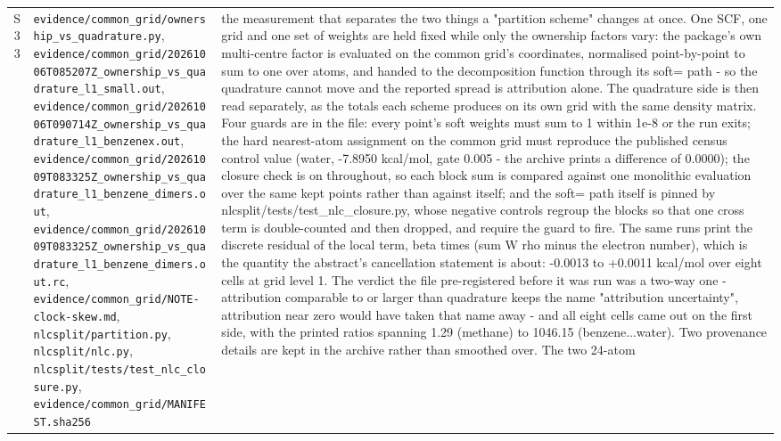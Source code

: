 \documentclass[11pt]{article}
\begin{document}
\begin{longtable}{c>{\raggedright\arraybackslash}p{}>{\raggedright\arraybackslash}p{}}
S33 & \texttt{evidence/\allowbreak{}common\_\allowbreak{}grid/\allowbreak{}ownership\_\allowbreak{}vs\_\allowbreak{}quadrature.py}, \texttt{evidence/\allowbreak{}common\_\allowbreak{}grid/\allowbreak{}20261006T085207Z\_\allowbreak{}ownership\_\allowbreak{}vs\_\allowbreak{}quadrature\_\allowbreak{}l1\_\allowbreak{}small.out}, \texttt{evidence/\allowbreak{}common\_\allowbreak{}grid/\allowbreak{}20261006T090714Z\_\allowbreak{}ownership\_\allowbreak{}vs\_\allowbreak{}quadrature\_\allowbreak{}l1\_\allowbreak{}benzenex.out}, \texttt{evidence/\allowbreak{}common\_\allowbreak{}grid/\allowbreak{}20261009T083325Z\_\allowbreak{}ownership\_\allowbreak{}vs\_\allowbreak{}quadrature\_\allowbreak{}l1\_\allowbreak{}benzene\_\allowbreak{}dimers.out}, \texttt{evidence/\allowbreak{}common\_\allowbreak{}grid/\allowbreak{}20261009T083325Z\_\allowbreak{}ownership\_\allowbreak{}vs\_\allowbreak{}quadrature\_\allowbreak{}l1\_\allowbreak{}benzene\_\allowbreak{}dimers.out.rc}, \texttt{evidence/\allowbreak{}common\_\allowbreak{}grid/\allowbreak{}NOTE-clock-skew.md}, \texttt{nlcsplit/partition.py}, \texttt{nlcsplit/nlc.py}, \texttt{nlcsplit/\allowbreak{}tests/\allowbreak{}test\_\allowbreak{}nlc\_\allowbreak{}closure.py}, \texttt{evidence/\allowbreak{}common\_\allowbreak{}grid/\allowbreak{}MANIFEST.sha256} & the measurement that separates the two things a "partition scheme" changes at once. One SCF, one grid and one set of weights are held fixed while only the ownership factors vary: the package's own multi-centre factor is evaluated on the common grid's coordinates, normalised point-by-point to sum to one over atoms, and handed to the decomposition function through its soft= path - so the quadrature cannot move and the reported spread is attribution alone. The quadrature side is then read separately, as the totals each scheme produces on its own grid with the same density matrix. Four guards are in the file: every point's soft weights must sum to 1 within 1e-8 or the run exits; the hard nearest-atom assignment on the common grid must reproduce the published census control value (water, -7.8950 kcal/mol, gate 0.005 - the archive prints a difference of 0.0000); the closure check is on throughout, so each block sum is compared against one monolithic evaluation over the same kept points rather than against itself; and the soft= path itself is pinned by nlcsplit/tests/test\_nlc\_closure.py, whose negative controls regroup the blocks so that one cross term is double-counted and then dropped, and require the guard to fire. The same runs print the discrete residual of the local term, beta times (sum W rho minus the electron number), which is the quantity the abstract's cancellation statement is about: -0.0013 to +0.0011 kcal/mol over eight cells at grid level 1. The verdict the file pre-registered before it was run was a two-way one - attribution comparable to or larger than quadrature keeps the name "attribution uncertainty", attribution near zero would have taken that name away - and all eight cells came out on the first side, with the printed ratios spanning 1.29 (methane) to 1046.15 (benzene...water). Two provenance details are kept in the archive rather than smoothed over. The two 24-atom 
\end{longtable}
\end{document}
